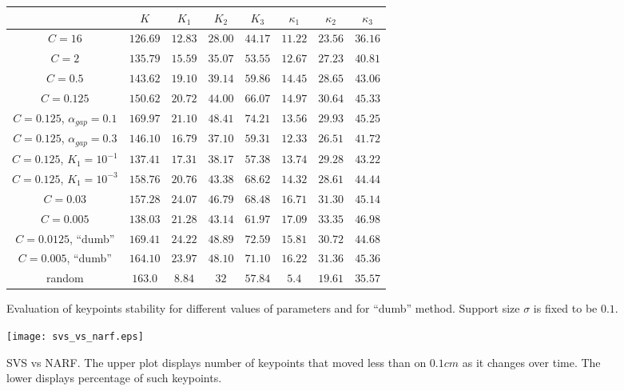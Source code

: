\begin{figure}
	\centering
\begin{tabular}{|c|c|c|c|c|c|c|c|}
\hline
& $K$ & $K_1$ & $K_2$ & $K_3$ & $\kappa_1$ & $\kappa_2$ & $\kappa_3$ \\

\hline %
$C = 16$ & $126.69$ & $12.83$ & $28.00$ & $44.17$ & $11.22$ & $23.56$ & $36.16$ \\

\hline %
$C = 2$ & $135.79$ & $15.59$ & $35.07$ & $53.55$ & $12.67$ & $27.23$ & $40.81$ \\

\hline %
$C=0.5$ & $143.62$ & $19.10$ & $39.14$ & $59.86$ & $14.45$ & $28.65$ & $43.06$ \\

\hline %
$C = 0.125$ & $150.62$ & $20.72$ & $44.00$ & $66.07$ & $14.97$ & $30.64$ & $45.33$ \\

\hline %
$C = 0.125$, $\alpha_{gap}=0.1$ & $169.97$ & $21.10$ & $48.41$ & $74.21$ & $13.56$ & $29.93$ & $45.25$ \\

\hline %
$C = 0.125$, $\alpha_{gap}=0.3$ & $146.10$ & $16.79$ & $37.10$ & $59.31$ & $12.33$ & $26.51$ & $41.72$ \\

\hline %
$C = 0.125$, $K_1=10^{-1}$ & $137.41$ & $17.31$ & $38.17$ & $57.38$ & $13.74$ & $29.28$ & $43.22$  \\

\hline %
$C = 0.125$, $K_1=10^{-3}$ & $158.76$ & $20.76$ & $43.38$ & $68.62$ & $14.32$ & $28.61$ & $44.44$ \\
	
\hline %
$C = 0.03$ & $157.28$ & $24.07$ & $46.79$ & $68.48$ & $16.71$ & $31.30$ & $45.14$ \\	

\hline %
$C = 0.005$ & $138.03$ & $21.28$ & $43.14$ & $61.97$ & $17.09$ & $33.35$ & $46.98$ \\	
	
\hline %
$C = 0.0125$, ``dumb'' & $169.41$ & $24.22$ & $48.89$ & $72.59$ & $15.81$ & $30.72$ & $44.68$ \\	

\hline %
$C = 0.005$, ``dumb'' & $164.10$ & $23.97$ & $48.10$ & $71.10$ & $16.22$ & $31.36$ & $45.36$ \\	


\hline %
random & $163.0$ & $8.84$ & $32$ & $57.84$ & $5.4$ & $19.61$ & $35.57$ \\

\hline
\end{tabular}
\caption{Evaluation of keypoints stability for different values of parameters and for ``dumb'' method. Support size $\sigma$ is fixed to be $0.1$.}
\label{figure:table1}
\end{figure}

\begin{figure}
\texttt{[image: svs\_vs\_narf.eps]}
\caption{SVS vs NARF. The upper plot displays number of keypoints that moved less than on $0.1 cm$ as it changes over time. The lower displays percentage of such keypoints.}
\label{figure:beda}
\end{figure}